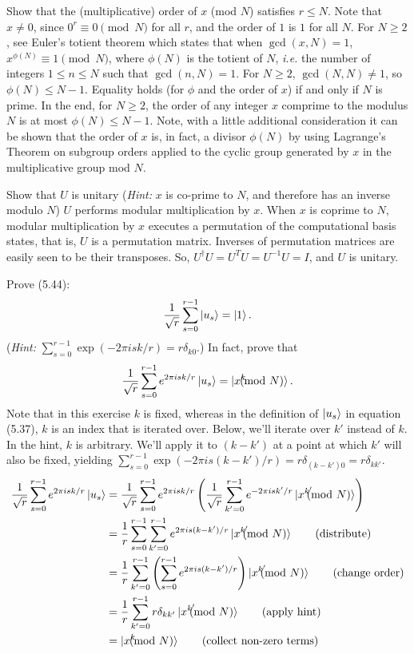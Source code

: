  Show that the (multiplicative) order of $x$ (mod $N$) satisfies $r \leq N$.
\Soln Note that $x\neq 0$, since $0^r \equiv 0 \pmod{N}$ for all $r$, and the order of $1$ is $1$ for all $N$.  For $N\geq 2$, see Euler's totient theorem which states that when $\gcd(x,N)=1$, $x^{\phi(N)}\equiv 1 \pmod{N}$, where $\phi(N)$ is the totient of $N$, \textit{i.e.} the number of integers $1\leq n \leq N$ such that $\gcd(n,N) = 1$.  For $N\geq 2$, $\gcd(N,N) \neq 1$, so $\phi(N) \leq N-1$.  Equality holds (for $\phi$ and the order of $x$) if and only if $N$ is prime.  In the end, for $N \geq 2$, the order of any integer $x$ comprime to the modulus $N$ is at most $\phi(N) \leq N-1$.  Note, with a little additional consideration it can be shown that the order of $x$ is, in fact, a divisor $\phi(N)$ by using Lagrange's Theorem on subgroup orders applied to the cyclic group generated by $x$ in the multiplicative group mod $N$.

 Show that $U$ is unitary (\textit{Hint:} $x$ is co-prime to $N$, and therefore has an inverse modulo $N$)
\Soln $U$ performs modular multiplication by $x$.  When $x$ is coprime to $N$, modular multiplication by $x$ executes a permutation of the computational basis states, that is, $U$ is a permutation matrix.  Inverses of permutation matrices are easily seen to be their transposes.  So, $U^\dagger U = U^TU = U^{-1}U = I$, and $U$ is unitary.

 Prove (5.44): $$\frac{1}{\sqrt{r}}\sum_{s=0}^{r-1}\ket{u_s} = \ket{1}.$$ (\textit{Hint:} $\sum_{s=0}^{r-1}\exp(-2\pi isk/r) = r\delta_{k0}$.)  In fact, prove that $$\frac{1}{\sqrt{r}}\sum_{s=0}^{r-1}e^{2\pi isk/r}\ket{u_s} = \ket{x^k\hspace{-10pt}\pmod{N}}.$$
\Soln Note that in this exercise $k$ is fixed, whereas in the definition of $\ket{u_s}$ in equation (5.37), $k$ is an index that is iterated over.  Below, we'll iterate over $k'$ instead of $k$.  In the hint, $k$ is arbitrary.  We'll apply it to $(k-k')$ at a point at which $k'$ will also be fixed, yielding $\sum_{s=0}^{r-1}\exp(-2\pi is(k-k')/r) = r\delta_{(k-k')0}=r\delta_{kk'}$.
\begin{align*}
\frac{1}{\sqrt{r}}\sum_{s=0}^{r-1}e^{2\pi isk/r}\ket{u_s} &= \frac{1}{\sqrt{r}}\sum_{s=0}^{r-1}e^{2\pi isk/r}\left(\frac{1}{\sqrt{r}}\sum_{k'=0}^{r-1}e^{-2\pi isk'/r}\ket{x^{k'}\hspace{-10pt}\pmod{N}}\right)\\
&= \frac{1}{r}\sum_{s=0}^{r-1}\sum_{k'=0}^{r-1}e^{2\pi is(k-k')/r}\ket{x^{k'}\hspace{-10pt}\pmod{N}} \tag{distribute} \\
&= \frac{1}{r}\sum_{k'=0}^{r-1}\left(\sum_{s=0}^{r-1}e^{2\pi is(k-k')/r}\right)\ket{x^{k'}\hspace{-10pt}\pmod{N}} \tag{change order} \\
&= \frac{1}{r}\sum_{k'=0}^{r-1}r\delta_{kk'}\ket{x^{k'}\hspace{-10pt}\pmod{N}} \tag{apply hint} \\
&= \ket{x^{k}\hspace{-10pt}\pmod{N}} \tag{collect non-zero terms}
\end{align*}

